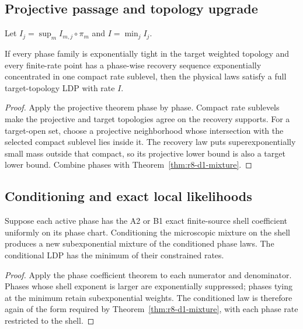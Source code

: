 \subsection{Projective passage and topology upgrade}

Let $I_j=\sup_m I_{m,j}\circ\pi_m$ and $I=\min_jI_j$.

\begin{theorem}
\label{thm:r8-d1-projective}
If every phase family is exponentially tight in the target weighted topology
and every finite-rate point has a phase-wise recovery sequence exponentially
concentrated in one compact rate sublevel, then the physical laws satisfy a
full target-topology LDP with rate $I$.
\end{theorem}

\begin{proof}
Apply the projective theorem phase by phase.  Compact rate sublevels make the
projective and target topologies agree on the recovery supports.  For a
target-open set, choose a projective neighborhood whose intersection with the
selected compact sublevel lies inside it.  The recovery law puts
superexponentially small mass outside that compact, so its projective lower
bound is also a target lower bound.  Combine phases with
Theorem~\ref{thm:r8-d1-mixture}.
\end{proof}

\subsection{Conditioning and exact local likelihoods}

\begin{theorem}
\label{thm:r8-d1-shell}
Suppose each active phase has the A2 or B1 exact finite-source shell coefficient
uniformly on its phase chart.  Conditioning the microscopic mixture on the
shell produces a new subexponential mixture of the conditioned phase laws.
The conditional LDP has the minimum of their constrained rates.
\end{theorem}

\begin{proof}
Apply the phase coefficient theorem to each numerator and denominator.  Phases
whose shell exponent is larger are exponentially suppressed; phases tying at
the minimum retain subexponential weights.  The conditioned law is therefore
again of the form required by Theorem~\ref{thm:r8-d1-mixture}, with each phase
rate restricted to the shell.
\end{proof}

